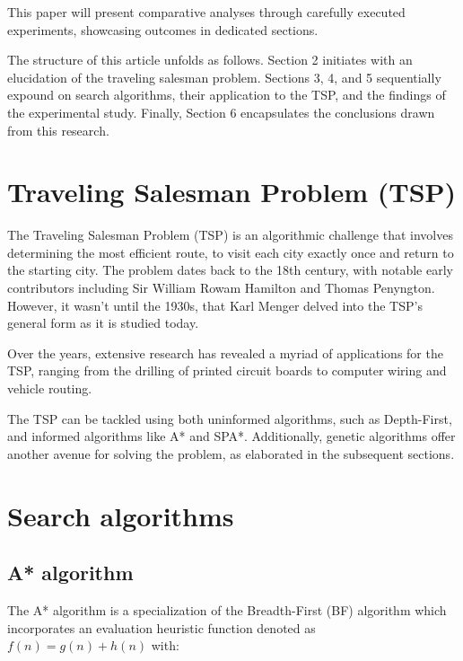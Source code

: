 \documentclass[runningheads]{llncs}
\begin{document}
This paper will present comparative analyses through carefully executed experiments, showcasing outcomes in dedicated sections. 

The structure of this article unfolds as follows. Section 2 initiates with an elucidation of the traveling salesman problem. Sections 3, 4, and 5 sequentially expound on search algorithms, their application to the TSP, and the findings of the experimental study. Finally, Section 6 encapsulates the conclusions drawn from this research.

%
\section{Traveling Salesman Problem (TSP)}
The Traveling Salesman Problem (TSP) is an algorithmic challenge that involves determining the most efficient route, to visit each city exactly once and return to the starting city. The problem dates back to the 18th century, with notable early contributors including Sir William Rowam Hamilton and Thomas Penyngton. However, it wasn't until the 1930s, that Karl Menger delved into the TSP's general form as it is studied today\cite{waterloo-web}.

Over the years, extensive research has revealed a myriad of applications for the TSP, ranging from the drilling of printed circuit boards to computer wiring and vehicle routing.

The TSP can be tackled using both uninformed algorithms, such as Depth-First, and informed algorithms like A* and SPA*. Additionally, genetic algorithms offer another avenue for solving the problem, as elaborated in the subsequent sections\cite{tsp-ta}.

% 
%
\section{Search algorithms}
\subsection{A* algorithm}
The A* algorithm is a specialization of the Breadth-First (BF) algorithm which incorporates an evaluation heuristic function denoted as $f(n)=g(n)+h(n)$ with: 
\end{document}
